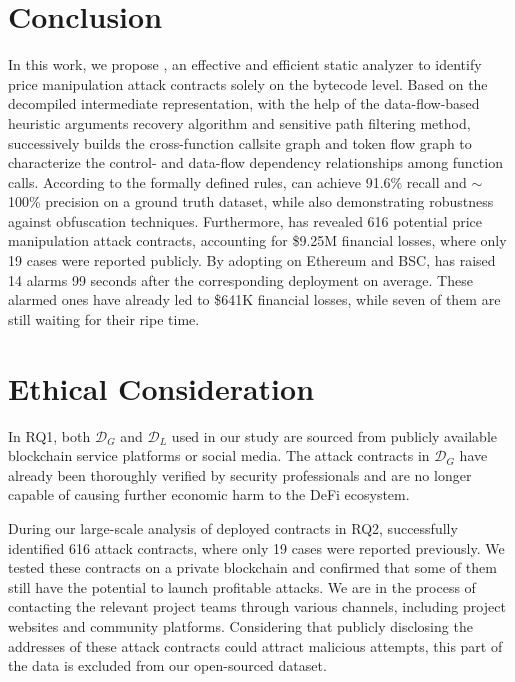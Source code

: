 \section{Conclusion}
\label{sec:conclu}
In this work, we propose {\tool}, an effective and efficient static analyzer to identify price manipulation attack contracts solely on the bytecode level.
Based on the decompiled intermediate representation, with the help of the data-flow-based heuristic arguments recovery algorithm and sensitive path filtering method, {\tool} successively builds the cross-function callsite graph and token flow graph to characterize the control- and data-flow dependency relationships among function calls.
According to the formally defined rules, {\tool} can achieve 91.6\% recall and $\sim$100\% precision on a ground truth dataset, while also demonstrating robustness against obfuscation techniques. Furthermore, {\tool} has revealed 616 potential price manipulation attack contracts, accounting for \$9.25M financial losses, where only 19 cases were reported publicly. By adopting {\tool} on Ethereum and BSC, {\tool} has raised 14 alarms 99 seconds after the corresponding deployment on average. These alarmed ones have already led to \$641K financial losses, while seven of them are still waiting for their ripe time.


\section*{Ethical Consideration}

In RQ1, both $\mathcal{D}_{G}$ and $\mathcal{D}_{L}$ used in our study are sourced from publicly available blockchain service platforms or social media. The attack contracts in  $\mathcal{D}_{G}$ have already been thoroughly verified by security professionals and are no longer capable of causing further economic harm to the DeFi ecosystem.

During our large-scale analysis of deployed contracts in RQ2, {\tool} successfully identified 616 attack contracts, where only 19 cases were reported previously. We tested these contracts on a private blockchain and confirmed that some of them still have the potential to launch profitable attacks.
We are in the process of contacting the relevant project teams through various channels, including project websites and community platforms. 
Considering that publicly disclosing the addresses of these attack contracts could attract malicious attempts, this part of the data is excluded from our open-sourced dataset. 

